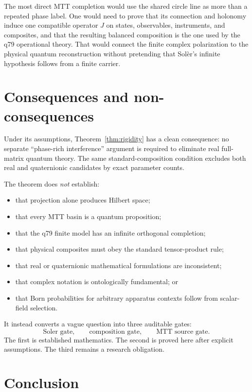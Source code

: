 \documentclass[11pt]{article}
\begin{document}
The most direct MTT completion would use the shared circle line as more than a repeated phase label. One would need to prove that its connection and holonomy induce one compatible operator \(J\) on states, observables, instruments, and composites, and that the resulting balanced composition is the one used by the q79 operational theory. That would connect the finite complex polarization to the physical quantum reconstruction without pretending that Sol\`er's infinite hypothesis follows from a finite carrier.

\section{Consequences and non-consequences}

Under its assumptions, Theorem~\ref{thm:rigidity} has a clean consequence: no separate ``phase-rich interference'' argument is required to eliminate real full-matrix quantum theory. The same standard-composition condition excludes both real and quaternionic candidates by exact parameter counts.

The theorem does \emph{not} establish:
\begin{itemize}
\item that projection alone produces Hilbert space;
\item that every MTT basin is a quantum proposition;
\item that the q79 finite model has an infinite orthogonal completion;
\item that physical composites must obey the standard tensor-product rule;
\item that real or quaternionic mathematical formulations are inconsistent;
\item that complex notation is ontologically fundamental; or
\item that Born probabilities for arbitrary apparatus contexts follow from scalar-field selection.
\end{itemize}

It instead converts a vague question into three auditable gates:
\[
\text{Soler gate},\qquad
\text{composition gate},\qquad
\text{MTT source gate}.
\]
The first is established mathematics. The second is proved here after explicit assumptions. The third remains a research obligation.

\section{Conclusion}
\end{document}
